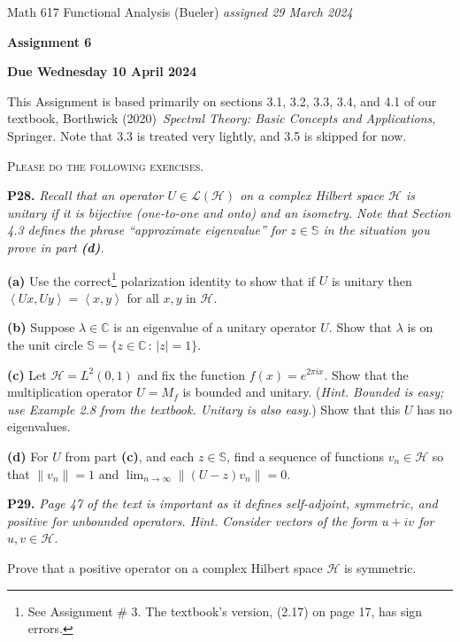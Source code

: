 \documentclass[12pt]{amsart}
\newcommand{\cH}{\mathcal{H}}
\newcommand{\cL}{\mathcal{L}}
\newcommand{\CC}{\mathbb{C}}
\newcommand{\ip}[2]{\ensuremath{\left<#1,#2\right>}}
\newcommand{\prob}[1]{\bigskip\noindent\textbf{#1.}\quad }
\newcommand{\epart}[1]{\medskip\noindent\textbf{(#1)}\quad }
\newcommand{\ds}{\displaystyle}
\begin{document}
\scriptsize \noindent Math 617 Functional Analysis (Bueler) \hfill \emph{assigned 29 March 2024}
\normalsize\medskip

\Large\centerline{\textbf{Assignment 6}}
\large
\medskip

\centerline{\textbf{Due Wednesday 10 April 2024}}
\medskip
\normalsize

\thispagestyle{empty}

\bigskip
\noindent This Assignment is based primarily on sections 3.1, 3.2, 3.3, 3.4, and 4.1 of our textbook, Borthwick (2020)~\emph{Spectral Theory: Basic Concepts and Applications}, Springer.  Note that 3.3 is treated very lightly, and 3.5 is skipped for now.

\medskip
\noindent \textsc{Please do the following exercises.}
\smallskip

\renewcommand{\SS}{\mathbb{S}}

\prob{P28}  \emph{Recall that an operator $U\in\cL(\cH)$ on a complex Hilbert space $\cH$ is \emph{unitary} if it is bijective (one-to-one and onto) and an isometry.  Note that Section 4.3 defines the phrase ``approximate eigenvalue'' for $z\in\SS$ in the situation you prove in part \emph{\textbf{(d)}}.}

\epart{a}  Use the correct\footnote{See Assignment \# 3.  The textbook's version, (2.17) on page 17, has sign errors.} polarization identity to show that if $U$ is unitary then $\ip{Ux}{Uy}=\ip{x}{y}$ for all $x,y$ in $\cH$.

\epart{b}  Suppose $\lambda \in\CC$ is an eigenvalue of a unitary operator $U$.  Show that $\lambda$ is on the unit circle $\SS = \{z\in\CC\,:\,|z|=1\}$.

\epart{c}  Let $\cH = L^2(0,1)$ and fix the function $f(x) = e^{2\pi i x}$.  Show that the multiplication operator $U=M_f$ is bounded and unitary.  (\emph{Hint. Bounded is easy; use Example 2.8 from the textbook. Unitary is also easy.})  Show that this $U$ has no eigenvalues.

\epart{d}  For $U$ from part \textbf{(c)}, and each $z\in\SS$, find a sequence of functions $v_n\in\cH$ so that $\|v_n\|=1$ and $\ds \lim_{n\to\infty} \|(U-z)v_n\|=0$.


\prob{P29} \emph{Page 47 of the text is important as it defines \emph{self-adjoint}, \emph{symmetric}, and \emph{positive} for unbounded operators.  Hint. Consider vectors of the form $u+iv$ for $u,v\in\cH$.}

\medskip\noindent Prove that a positive operator on a complex Hilbert space $\cH$ is symmetric.
\end{document}
